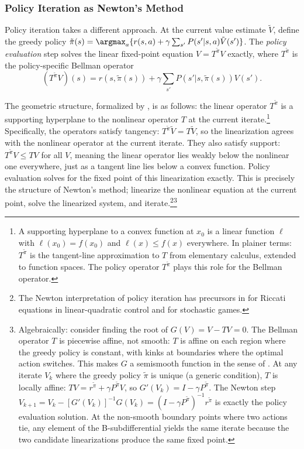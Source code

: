 \subsubsection{Policy Iteration as Newton's Method}

Policy iteration takes a different approach. At the current value estimate $\tilde{V}$, define the greedy policy $\tilde{\pi}(s) = \argmax_a \{ r(s,a) + \gamma \sum_{s'} P(s'|s,a) \tilde{V}(s') \}$. The \emph{policy evaluation} step solves the linear fixed-point equation $V = T^{\tilde{\pi}} V$ exactly, where $T^{\tilde{\pi}}$ is the policy-specific Bellman operator
\begin{equation}
(T^{\tilde{\pi}} V)(s) = r(s, \tilde{\pi}(s)) + \gamma \sum_{s'} P(s'|s,\tilde{\pi}(s)) V(s').
\end{equation}

The geometric structure, formalized by \citet{puterman1979}, is as follows: the linear operator $T^{\tilde{\pi}}$ is a supporting hyperplane to the nonlinear operator $T$ at the current iterate.\footnote{A supporting hyperplane to a convex function at $x_0$ is a linear function $\ell$ with $\ell(x_0) = f(x_0)$ and $\ell(x) \leq f(x)$ everywhere. In plainer terms: $T^{\tilde{\pi}}$ is the tangent-line approximation to $T$ from elementary calculus, extended to function spaces. The policy operator $T^{\tilde{\pi}}$ plays this role for the Bellman operator.} Specifically, the operators satisfy tangency: $T^{\tilde{\pi}} \tilde{V} = T\tilde{V}$, so the linearization agrees with the nonlinear operator at the current iterate. They also satisfy support: $T^{\tilde{\pi}} V \leq TV$ for all $V$, meaning the linear operator lies weakly below the nonlinear one everywhere, just as a tangent line lies below a convex function. Policy evaluation solves for the fixed point of this linearization exactly. This is precisely the structure of Newton's method; linearize the nonlinear equation at the current point, solve the linearized system, and iterate.\footnote{The Newton interpretation of policy iteration has precursors in \citet{kleinman1968} for Riccati equations in linear-quadratic control and \citet{pollatschek1969} for stochastic games.}\footnote{Algebraically: consider finding the root of $G(V) = V - TV = 0$. The Bellman operator $T$ is piecewise affine, not smooth: $T$ is affine on each region where the greedy policy is constant, with kinks at boundaries where the optimal action switches. This makes $G$ a semismooth function in the sense of \citet{qi1993}. At any iterate $V_k$ where the greedy policy $\tilde{\pi}$ is unique (a generic condition), $T$ is locally affine: $TV = r^{\tilde{\pi}} + \gamma P^{\tilde{\pi}} V$, so $G'(V_k) = I - \gamma P^{\tilde{\pi}}$. The Newton step $V_{k+1} = V_k - [G'(V_k)]^{-1} G(V_k) = (I - \gamma P^{\tilde{\pi}})^{-1} r^{\tilde{\pi}}$ is exactly the policy evaluation solution. At the non-smooth boundary points where two actions tie, any element of the B-subdifferential yields the same iterate because the two candidate linearizations produce the same fixed point.}

